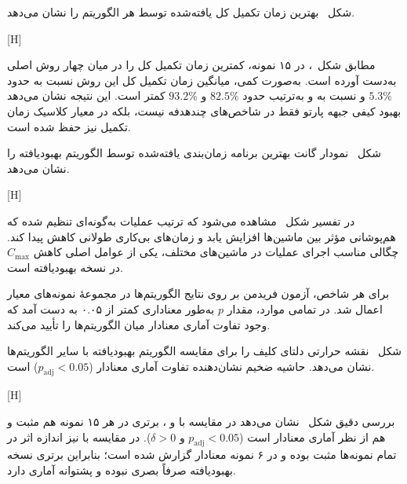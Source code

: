 
شکل~ بهترین زمان تکمیل کل یافته‌شده توسط هر الگوریتم را نشان می‌دهد.

[H]

مطابق شکل~، 
در ۱۵ نمونه، کمترین زمان تکمیل کل را در میان چهار روش اصلی به‌دست آورده است.
به‌صورت کمی، میانگین زمان تکمیل کل این روش نسبت به  حدود $5.3\%$
و نسبت به  و  به‌ترتیب حدود $82.5\%$ و $93.2\%$
کمتر است. این نتیجه نشان می‌دهد بهبود کیفی جبهه پارتو فقط در شاخص‌های چندهدفه نیست،
بلکه در معیار کلاسیک زمان تکمیل نیز حفظ شده است.



شکل~ نمودار گانت بهترین برنامه زمان‌بندی یافته‌شده
توسط الگوریتم بهبودیافته را نشان می‌دهد.

[H]

در تفسیر شکل~ مشاهده می‌شود که ترتیب عملیات به‌گونه‌ای تنظیم شده
که هم‌پوشانی مؤثر بین ماشین‌ها افزایش یابد و زمان‌های بی‌کاری طولانی کاهش پیدا کند.
چگالی مناسب اجرای عملیات در ماشین‌های مختلف، یکی از عوامل اصلی کاهش
$C_{\max}$ در نسخه بهبودیافته است.




برای هر شاخص، آزمون فریدمن بر روی نتایج الگوریتم‌ها در مجموعهٔ نمونه‌های معیار اعمال شد.
در تمامی موارد، مقدار $p$ به‌طور معناداری کمتر از ۰.۰۵ به دست آمد
که وجود تفاوت آماری معنادار میان الگوریتم‌ها را تأیید می‌کند.


شکل~ نقشه حرارتی دلتای کلیف را
برای مقایسه الگوریتم بهبودیافته با سایر الگوریتم‌ها نشان می‌دهد.
حاشیه ضخیم نشان‌دهنده تفاوت آماری معنادار ($p_{\text{adj}} < 0.05$) است.

[H]

بررسی دقیق شکل~ نشان می‌دهد در مقایسه با
 و ، برتری 
در هر ۱۵ نمونه هم مثبت و هم از نظر آماری معنادار است
($p_{\text{adj}}<0.05$ و $\delta>0$). در مقایسه با  نیز
اندازه اثر در تمام نمونه‌ها مثبت بوده و در ۶ نمونه معنادار گزارش شده است؛
بنابراین برتری نسخه بهبودیافته صرفاً بصری نبوده و پشتوانه آماری دارد.


